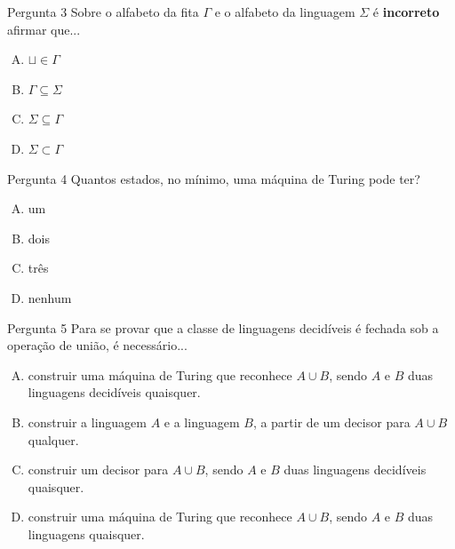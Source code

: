 \documentclass[xcolor=dvipsnames,table]{beamer}
\begin{document}
	\begin{frame}
		\begin{block}{Pergunta 3}
			Sobre o alfabeto da fita $\Gamma$ e o alfabeto da linguagem $\Sigma$ é {\bf incorreto} afirmar que...
		\end{block}
		\begin{enumerate}[(A)]
			\item $\sqcup \in \Gamma$ 
			\item $\Gamma \subseteq \Sigma$
			\item $\Sigma \subseteq \Gamma$
			\item $\Sigma \subset \Gamma$
		\end{enumerate}
	\end{frame}

	\begin{frame}
		\begin{block}{Pergunta 4}
			Quantos estados, no mínimo, uma máquina de Turing pode ter?
		\end{block}
		\begin{enumerate}[(A)]
			\item um
			\item dois
			\item três
			\item nenhum
		\end{enumerate}
	\end{frame}

	\begin{frame}
		\begin{block}{Pergunta 5}
			Para se provar que a classe de linguagens decidíveis é fechada sob a operação de união, é necessário...
		\end{block}
		\begin{enumerate}[(A)]
			\item construir uma máquina de Turing que reconhece $A \cup B$, sendo $A$ e $B$ duas linguagens decidíveis quaisquer.
			\item construir a linguagem $A$ e a linguagem $B$, a partir de um decisor para $A \cup B$ qualquer.
			\item construir um decisor para $A \cup B$, sendo $A$ e $B$ duas linguagens decidíveis quaisquer.
			\item construir uma máquina de Turing que reconhece $A \cup B$, sendo $A$ e $B$ duas linguagens quaisquer.
		\end{enumerate}
	\end{frame}
\end{document}
